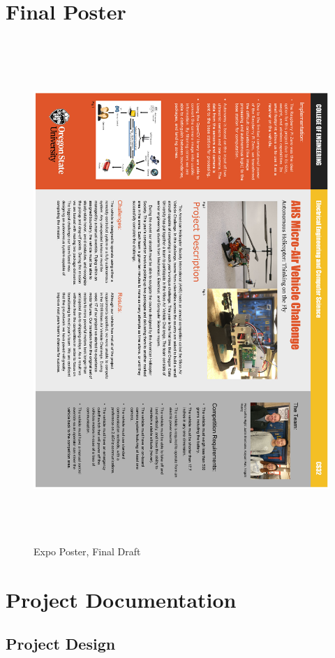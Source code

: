 \documentclass[onecolumn, draftclsnofoot,10pt, compsoc]{IEEEtran}
\begin{document}
\section{Final Poster}
\begin{figure}[ht]
\centering
\includegraphics[height=7.5in]{poster_expo}
\caption{Expo Poster, Final Draft}
\end{figure}


\newpage
\section{Project Documentation}

\subsection{Project Design}
\end{document}
